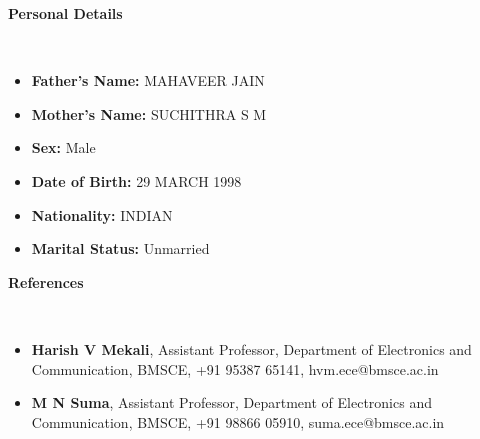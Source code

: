 \documentclass[a4paper,10pt]{article}
\newcommand{\lsep}{-0.5cm}
\newcommand{\resheading}[1]{{\small \colorbox{mygrey}{\begin{minipage}{0.975\textwidth}{\textbf{#1 \vphantom{p\^{E}}}}\end{minipage}}}}
\begin{document}
\resheading{\textbf{Personal Details} }\\[\lsep]
\begin{itemize}
\item \noindent \textbf{Father's Name:} MAHAVEER JAIN
\item \noindent \textbf{Mother's Name:} SUCHITHRA S M
\item \noindent \textbf{Sex:} Male
\item \noindent \textbf{Date of Birth:} 29 MARCH 1998
\item \noindent \textbf{Nationality:} INDIAN
\item \noindent \textbf{Marital Status:} Unmarried
\end{itemize}

\resheading{\textbf{References} }\\[\lsep]
\begin{itemize}
\item\noindent\textbf{Harish V Mekali}, Assistant Professor, Department of Electronics and Communication, BMSCE, +91 95387 65141, hvm.ece@bmsce.ac.in
\item\noindent\textbf{M N Suma}, Assistant Professor, Department of Electronics and Communication, BMSCE, +91 98866 05910, suma.ece@bmsce.ac.in
\end{itemize}
\end{document}
